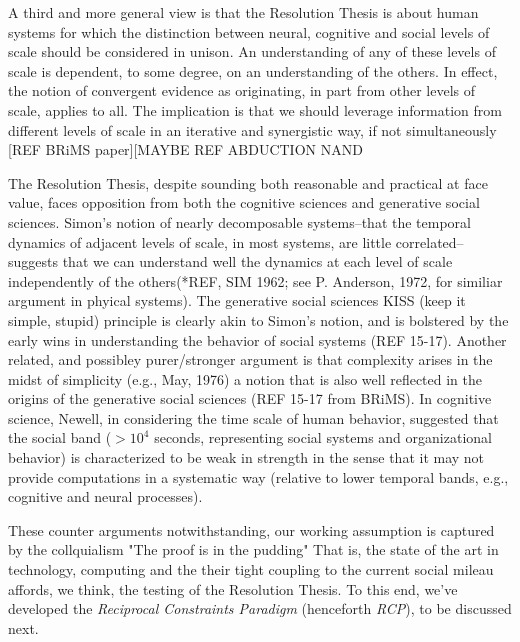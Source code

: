 \documentclass{article}
\begin{document}
A third and more general view is that the Resolution Thesis is about human systems for which the distinction between neural, cognitive and social levels of scale should be considered in unison.  An understanding of any of these levels of scale is dependent, to some degree, on an understanding of the others.  In effect, the notion of convergent evidence as originating, in part from other levels of scale, applies to all.  The implication is that we should leverage information from different levels of scale in an iterative and synergistic way, if not simultaneously [REF BRiMS paper][MAYBE REF ABDUCTION NAND 

The Resolution Thesis, despite sounding both reasonable and practical at face value, faces opposition from both the cognitive sciences and generative social sciences.  Simon's notion of nearly decomposable systems--that the temporal dynamics of adjacent levels of scale, in most systems, are little correlated--suggests that we can understand well the dynamics at each level of scale independently of the others(*REF, SIM 1962; see P. Anderson, 1972, for similiar argument in phyical systems).  The generative social sciences KISS (keep it simple, stupid) principle is clearly akin to Simon's notion, and is bolstered by the early wins in understanding the behavior of social systems (REF 15-17).   Another related, and possibley purer/stronger argument is that complexity arises in the midst of simplicity (e.g., May, 1976) a notion that is also well reflected in the origins of the generative social sciences (REF 15-17 from BRiMS).  In cognitive science, Newell, in considering the time scale of human behavior, suggested that the social band ($> 10^4$ seconds, representing social systems and organizational behavior) is characterized to be weak in strength in the sense that it may not provide computations in a systematic way (relative to lower temporal bands, e.g., cognitive and neural processes).  

These counter arguments notwithstanding, our working assumption is captured by the collquialism "The proof is in the pudding"  That is, the state of the art in technology, computing and the their tight coupling to the current social mileau affords, we think, the testing of the Resolution Thesis.   To this end, we've developed the \textit{Reciprocal Constraints Paradigm} (henceforth \textit{RCP}), to be discussed next.
\end{document}

